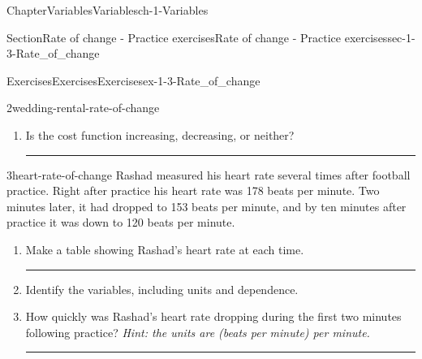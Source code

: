 \documentclass[twoside,11pt,]{book}
\newlength{\workspacestrutwidth}
\numberwithin{equation}{section}
\newcommand{\amp}{&}
\begin{document}
\begin{chapterptx}{Chapter}{Variables}{}{Variables}{}{}{ch-1-Variables}
\begin{sectionptx}{Section}{Rate of change - Practice exercises}{}{Rate of change - Practice exercises}{}{}{sec-1-3-Rate_of_change}
\begin{exercises-subsection-numberless}{Exercises}{Exercises}{}{Exercises}{}{}{ex-1-3-Rate_of_change}
\begin{divisionexercise}{2}{}{}{wedding-rental-rate-of-change}
\begin{enumerate}[label=(\alph*),ref=\alph*]
\item{}Is the cost function increasing, decreasing, or neither?%
\par\rule{\workspacestrutwidth}{0.75in}%
\end{enumerate}%
\end{divisionexercise}%
\clearpage
\begin{divisionexercise}{3}{}{}{heart-rate-of-change}%
Rashad measured his heart rate several times after football practice. Right after practice his heart rate was 178 beats per minute. Two minutes later, it had dropped to 153 beats per minute, and by ten minutes after practice it was down to 120 beats per minute.%
\begin{enumerate}[label=(\alph*),ref=\alph*]%
\item{}Make a table showing Rashad's heart rate at each time.%
\par\rule{\workspacestrutwidth}{0.75in}%
\item{}Identify the variables, including units and dependence.%
\par
    \hspace{-2cm}
%
%
\item{}How quickly was Rashad's heart rate dropping during the first two minutes following practice? \emph{Hint: the units are (beats per minute) per minute.}%
\par\rule{\workspacestrutwidth}{0.75in}%

\end{enumerate}
\end{divisionexercise}
\end{exercises-subsection-numberless}
\end{sectionptx}
\end{chapterptx}
\end{document}
